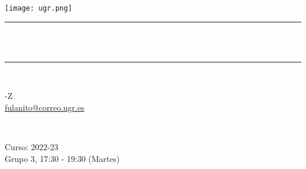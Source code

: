 \begin{titlepage}
	\centering
	\texttt{[image: ugr.png]}\\[1.0 cm]
	\rule{\linewidth}{0.2 mm} \\[0.4 cm]
	{ \huge \bfseries \thetitle}\\
	\rule{\linewidth}{0.2 mm} \\[1.5 cm]
	
	\begin{minipage}{0.5\textwidth}
		\begin{flushleft} \large
			-Z \\
			\href{mailto:fulanito@correo.ugr.es}{fulanito@correo.ugr.es}
		\end{flushleft}
	\end{minipage}~
	\begin{minipage}{0.5\textwidth}
		\begin{flushright} \large
			Curso: 2022-23 \\
			Grupo 3, 17:30 - 19:30 (Martes)                   
		\end{flushright}
	\end{minipage}\\[1 cm]
	
	{\small \thedate}\\[1 cm]
	
	\vfill
	
\end{titlepage}
